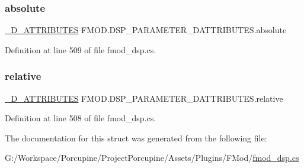 \subsubsection{\texorpdfstring{absolute}{absolute}}
{\footnotesize\ttfamily \hyperlink{struct_f_m_o_d_1_1__3_d___a_t_t_r_i_b_u_t_e_s}{\+\_\+D\+\_\+\+A\+T\+T\+R\+I\+B\+U\+T\+ES} F\+M\+O\+D.\+D\+S\+P\+\_\+\+P\+A\+R\+A\+M\+E\+T\+E\+R\+\_\+D\+A\+T\+T\+R\+I\+B\+U\+T\+E\+S.\+absolute}



Definition at line 509 of file fmod\+\_\+dsp.\+cs.

\mbox{\label{struct_f_m_o_d_1_1_d_s_p___p_a_r_a_m_e_t_e_r__3_d_a_t_t_r_i_b_u_t_e_s_a60dc1cb77deef002ff02c79c5e0c447f}} 
\subsubsection{\texorpdfstring{relative}{relative}}
{\footnotesize\ttfamily \hyperlink{struct_f_m_o_d_1_1__3_d___a_t_t_r_i_b_u_t_e_s}{\+\_\+D\+\_\+\+A\+T\+T\+R\+I\+B\+U\+T\+ES} F\+M\+O\+D.\+D\+S\+P\+\_\+\+P\+A\+R\+A\+M\+E\+T\+E\+R\+\_\+D\+A\+T\+T\+R\+I\+B\+U\+T\+E\+S.\+relative}



Definition at line 508 of file fmod\+\_\+dsp.\+cs.



The documentation for this struct was generated from the following file\+:\begin{DoxyCompactItemize}
\item 
G\+:/\+Workspace/\+Porcupine/\+Project\+Porcupine/\+Assets/\+Plugins/\+F\+Mod/\hyperlink{fmod__dsp_8cs}{fmod\+\_\+dsp.\+cs}\end{DoxyCompactItemize}
